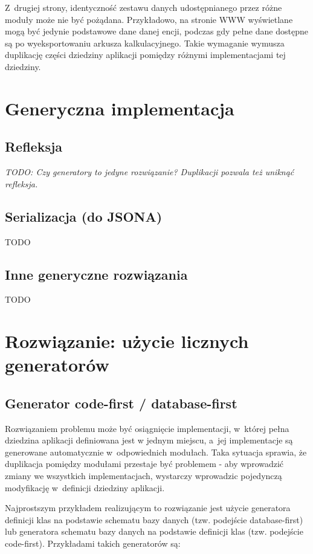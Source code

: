 Z~drugiej strony, identyczność zestawu danych udostępnianego przez różne moduły może nie być pożądana.
Przykładowo, na stronie WWW wyświetlane mogą być jedynie podstawowe dane danej encji, podczas gdy pełne dane dostępne są po wyeksportowaniu arkusza kalkulacyjnego.
Takie wymaganie wymusza duplikację części dziedziny aplikacji pomiędzy różnymi implementacjami tej dziedziny.



\section{Generyczna implementacja}

\subsection{Refleksja}
\emph{TODO: Czy generatory to jedyne rozwiązanie? Duplikacji pozwala też uniknąć refleksja.}


\subsection{Serializacja (do JSONA)}
TODO


\subsection{Inne generyczne rozwiązania}
TODO



\section{Rozwiązanie: użycie licznych generatorów}

\subsection{Generator code-first / database-first}

Rozwiązaniem problemu może być osiągnięcie implementacji, w~której pełna dziedzina aplikacji definiowana jest w jednym miejscu, a~jej implementacje są generowane automatycznie w~odpowiednich modułach.
Taka sytuacja sprawia, że duplikacja pomiędzy modułami przestaje być problemem - aby wprowadzić zmiany we wszystkich implementacjach, wystarczy wprowadzic pojedynczą modyfikację w~definicji dziedziny aplikacji.

Najprostszym przykładem realizującym to rozwiązanie jest użycie generatora definicji klas na podstawie schematu bazy danych (tzw. podejście database-first) lub generatora schematu bazy danych na podstawie definicji klas (tzw. podejście code-first).
Przykładami takich generatorów są:

